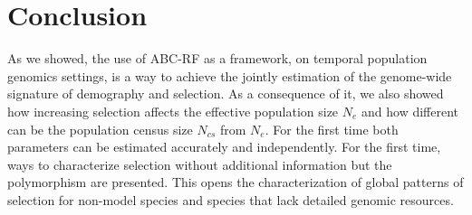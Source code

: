\documentclass[12pt]{article}
\begin{document}
\section*{Conclusion}
As we showed, the use of ABC-RF as a framework, on temporal population genomics settings, is a way to achieve the jointly estimation of the genome-wide signature of demography and selection. As a consequence of it, we also showed how increasing selection affects the effective population size $N_{e}$ and how different can be the population census size $N_{cs}$ from $N_{e}$. For the first time both parameters can be estimated accurately and independently. For the first time, ways to characterize selection without additional information but the polymorphism are presented. This opens the characterization of global patterns of selection for non-model species and species that lack detailed genomic resources.



\end{document}
